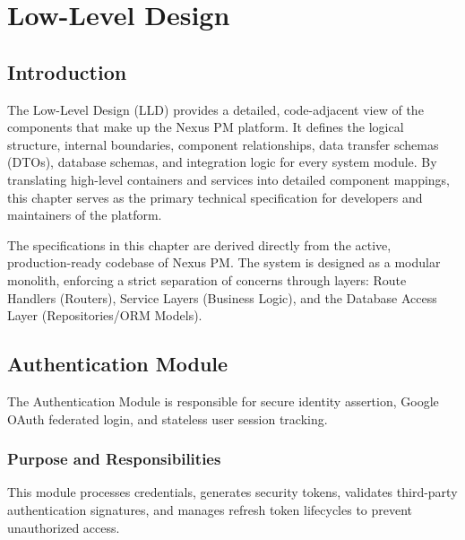 \chapter{Low-Level Design}
\label{chap:low-level-design}

\section{Introduction}
The Low-Level Design (LLD) provides a detailed, code-adjacent view of the components that make up the Nexus PM platform. It defines the logical structure, internal boundaries, component relationships, data transfer schemas (DTOs), database schemas, and integration logic for every system module. By translating high-level containers and services into detailed component mappings, this chapter serves as the primary technical specification for developers and maintainers of the platform.

The specifications in this chapter are derived directly from the active, production-ready codebase of Nexus PM. The system is designed as a modular monolith, enforcing a strict separation of concerns through layers: Route Handlers (Routers), Service Layers (Business Logic), and the Database Access Layer (Repositories/ORM Models).

\section{Authentication Module}
The Authentication Module is responsible for secure identity assertion, Google OAuth federated login, and stateless user session tracking.

\subsection{Purpose and Responsibilities}
This module processes credentials, generates security tokens, validates third-party authentication signatures, and manages refresh token lifecycles to prevent unauthorized access.

